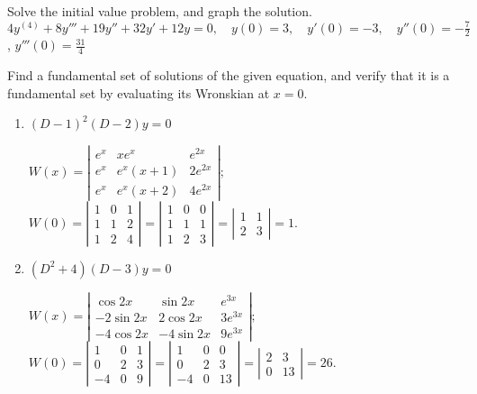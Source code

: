 \documentclass{ximera}
\begin{document}
\begin{problem}\label{exer:9.2.27}  Solve the
initial value problem, and graph the solution.
$4y^{(4)}+8y'''+19y''+32y'+12y=0, \quad  y(0)=3,\quad y'(0)=-3,\quad y''(0)=
-\frac{7}{2}$,
 $y'''(0)=\frac{31}{4}$
\end{problem}

\begin{problem}\label{exer:9.2.28}
Find a fundamental set of solutions of the given equation, and verify that it is a fundamental set by evaluating its Wronskian at $x=0$.

\begin{enumerate}
    \item $(D-1)^2(D-2)y=0$

\begin{solution}
$
W(x)=\left|\begin{array}{ccc}
e^x&xe^x&e^{2x}\\
e^x&e^x(x+1)&2e^{2x}\\
e^x&e^x(x+2)&4e^{2x}
\end{array}\right|;
$
$
W(0)=\left|\begin{array}{cccc}
1&0&1\\1&1&2\\1&2&4
\end{array}\right|=
\left|\begin{array}{cccc}
1&0&0\\1&1&1\\1&2&3
\end{array}\right|
=\left|\begin{array}{cccc}
1&1\\2&3\end{array}\right|=1.
$
\end{solution}

    \item $(D^2+4)(D-3)y=0$

\begin{solution}
$
W(x)=\left|\begin{array}{ccc}
\cos 2x&\sin 2x&e^{3x}\\
-2\sin 2x&2\cos 2x&3e^{3x}\\
-4\cos 2x&-4\sin 2x&9e^{3x}
\end{array}\right|;
$
$
W(0)=\left|\begin{array}{rccc}
1&0&1\\0&2&3\\-4&0&9
\end{array}\right|=
\left|\begin{array}{rccc}
1&0&0\\0&2&3\\-4&0&13
\end{array}\right|=
\left|\begin{array}{rccc}
2&3\\0&13\end{array}\right|=26.
$
\end{solution}


\end{enumerate}
\end{problem}
\end{document}
